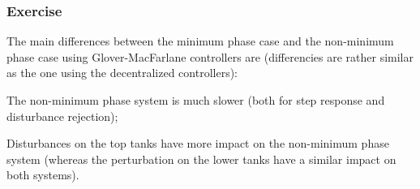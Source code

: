 \subsubsection{Exercise} 

The main differences between the minimum phase case and the non-minimum phase case using Glover-MacFarlane controllers are (differencies are rather similar as the one using the decentralized controllers):
\begin{shortitemize}
    \item The non-minimum phase system is much slower (both for step response and disturbance rejection);
    \item Disturbances on the top tanks have more impact on the non-minimum phase system (whereas the perturbation on the lower tanks have a similar impact on both systems).
\end{shortitemize}

